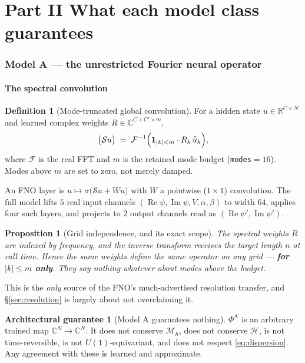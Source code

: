 \documentclass[11pt,a4paper]{article}
\theoremstyle{plain}
\newtheorem{proposition}[theorem]{Proposition}
\theoremstyle{definition}
\newtheorem{definition}[theorem]{Definition}
\newtheorem{guarantee}[theorem]{Architectural guarantee}
\theoremstyle{remark}
\newcommand{\R}{\mathbb{R}}
\newcommand{\C}{\mathbb{C}}
\newcommand{\Flow}{\Phi}
\newcommand{\Ham}{\mathcal{H}}
\newcommand{\Mass}{\mathcal{M}}
\newcommand{\code}[1]{\texttt{\small #1}}
\DeclareMathOperator{\Imag}{Im}
\DeclareMathOperator{\Real}{Re}
\begin{document}
\part*{Part II \quad What each model class guarantees}

\section{Model A --- the unrestricted Fourier neural operator}
\label{sec:fno}

\subsection{The spectral convolution}

\begin{definition}[Mode-truncated global convolution]
For a hidden state $u\in\R^{C\times N}$ and learned complex weights
$R\in\C^{C\times C'\times m}$,
\[
\bigl(\mathcal{S}u\bigr) \;=\; \mathcal{F}^{-1}\Bigl( \mathbf{1}_{|k|<m}\cdot R_k\,\widehat{u}_k \Bigr),
\]
where $\mathcal{F}$ is the real FFT and $m$ is the retained mode budget
(\code{modes}$=16$). Modes above $m$ are set to zero, not merely damped.
\end{definition}

An FNO layer is $u\mapsto \sigma\bigl(\mathcal{S}u + Wu\bigr)$ with $W$ a pointwise
($1\times1$) convolution. The full model lifts $5$ real input channels
$(\Real\psi,\Imag\psi,V,\alpha,\beta)$ to width $64$, applies four such layers, and
projects to $2$ output channels read as $(\Real\psi',\Imag\psi')$.

\begin{proposition}[Grid independence, and its exact scope]
\label{prop:fnogrid}
The spectral weights $R$ are indexed by \emph{frequency}, and the inverse transform
receives the target length $n$ at call time. Hence the same weights define the same
operator on any grid --- \textbf{for $|k|\le m$ only}. They say nothing whatever about
modes above the budget.
\end{proposition}

This is the \emph{only} source of the FNO's much-advertised resolution transfer, and
\S\ref{sec:resolution} is largely about not overclaiming it.

\begin{guarantee}[Model A guarantees nothing]
\label{guar:fnonone}
$\Flow^{\mathrm{A}}$ is an arbitrary trained map $\C^N\to\C^N$. It does not conserve
$\Mass_h$, does not conserve $\Ham$, is not time-reversible, is not $U(1)$-equivariant,
and does not respect \eqref{eq:dispersion}. Any agreement with these is learned and
approximate.
\end{guarantee}
\end{document}
